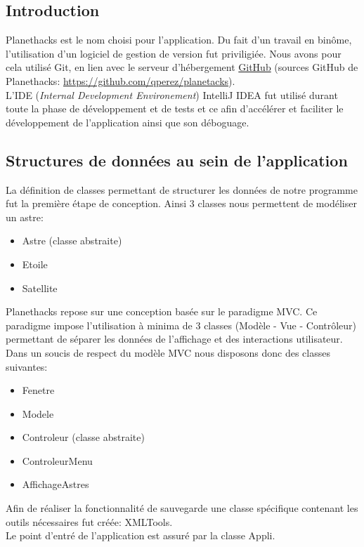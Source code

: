 \documentclass[a4paper,10pt]{article}
\begin{document}
\subsection{Introduction}
Planethacks est le nom choisi pour l'application. Du fait d'un travail en binôme, l'utilisation
d'un logiciel de gestion de version fut priviligiée. Nous avons pour cela utilisé Git, en lien avec le serveur d'hébergement \href{https://github.com}{GitHub} (sources GitHub de Planethacks: \url{https://github.com/qperez/planetacks}). \\
L'IDE (\textit{Internal Development Environement}) IntelliJ IDEA fut utilisé durant toute la phase de développement et de tests et ce afin 
d'accélérer et faciliter le développement de l'application ainsi que son déboguage.

\subsection{Structures de données au sein de l'application}
La définition de classes permettant de structurer les données de notre programme fut la première étape de conception. Ainsi 3 classes 
nous permettent de modéliser un astre:
\begin{itemize}
  \item Astre (classe abstraite)
  \item Etoile
  \item Satellite
\end{itemize}

Planethacks repose sur une conception basée sur le paradigme MVC. Ce paradigme impose l'utilisation à minima de 3 classes (Modèle - Vue - Contrôleur) permettant de
séparer les données de l'affichage et des interactions utilisateur. \\ 
Dans un soucis de respect du modèle MVC nous disposons donc des classes suivantes:
\begin{itemize}
  \item Fenetre
  \item Modele
  \item Controleur (classe abstraite)
  \item ControleurMenu
  \item AffichageAstres
\end{itemize}

Afin de réaliser la fonctionnalité de sauvegarde une classe spécifique contenant les outils nécessaires fut créée: XMLTools. \\
Le point d'entré de l'application est assuré par la classe Appli.
\end{document}
